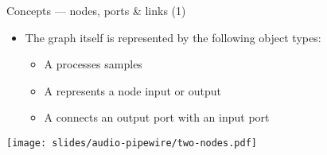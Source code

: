 \begin{frame}{Concepts — nodes, ports \& links (1)}
  \begin{itemize}

  \item The graph itself is represented by the following object types:

    \begin{itemize}
    \item A  processes samples
    \item A  represents a node input or output
    \item A  connects an output port with an input port
    \end{itemize}

  \end{itemize}

  \begin{center}
    \texttt{[image: slides/audio-pipewire/two-nodes.pdf]}\\
  \end{center}
\end{frame}




